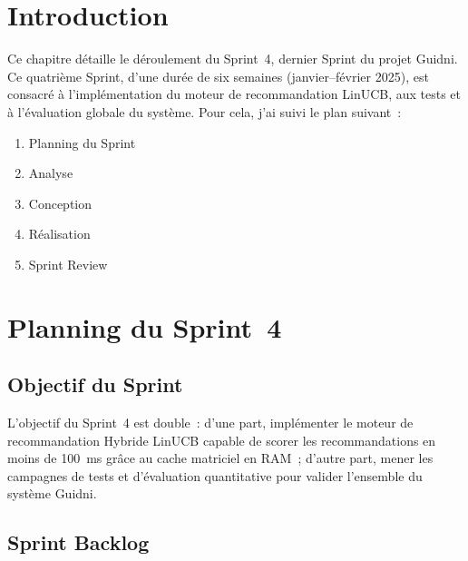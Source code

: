 
\section{Introduction}

Ce chapitre détaille le déroulement du Sprint~4, dernier Sprint du projet Guidni. Ce
quatrième Sprint, d'une durée de six semaines (janvier--février 2025), est consacré à
l'implémentation du moteur de recommandation LinUCB, aux tests et à l'évaluation globale
du système. Pour cela, j'ai suivi le plan suivant~:
\begin{enumerate}
    \item Planning du Sprint
    \item Analyse
    \item Conception
    \item Réalisation
    \item Sprint Review
\end{enumerate}


\section{Planning du Sprint~4}

\subsection{Objectif du Sprint}

L'objectif du Sprint~4 est double~: d'une part, implémenter le moteur de recommandation
Hybride LinUCB capable de scorer les recommandations en moins de 100~ms grâce au cache
matriciel en RAM~; d'autre part, mener les campagnes de tests et d'évaluation quantitative
pour valider l'ensemble du système Guidni.

\subsection{Sprint Backlog}

